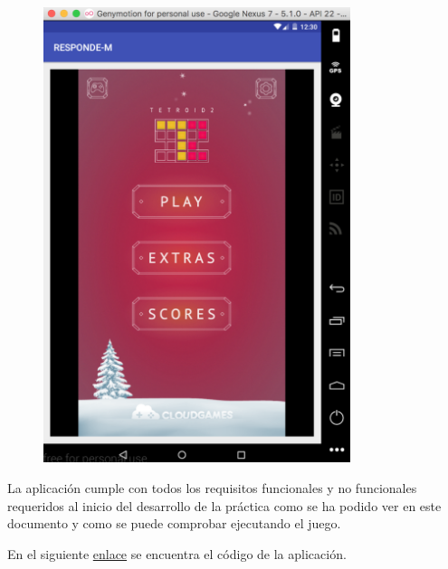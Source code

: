 \documentclass[10pt]{article}
\begin{document}
\begin{figure}[H]
	\begin{center}
 		\includegraphics[width = 0.8\textwidth]{Imagenes/captura6.eps}
	\end{center} 
\end{figure}

La aplicación cumple con todos los requisitos funcionales y no funcionales requeridos al inicio del desarrollo de la práctica como se ha podido ver en este documento y como se puede comprobar ejecutando el juego. 

En el siguiente \href{https://consigna.ugr.es/g/LyX7JFBZBCqNw4WG/GarciaMandayJesus-p5.zip}{enlace} se encuentra el código de la aplicación. 
\end{document}
